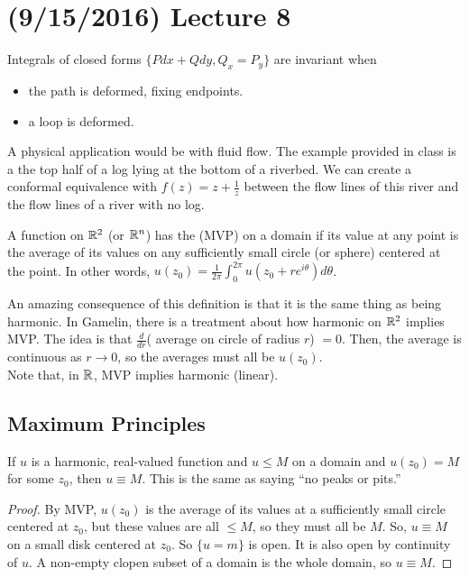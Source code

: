 \documentclass[11pt,leqno,oneside]{amsart}
\numberwithin{thm}{section}
\begin{document}
  \section{(9/15/2016) Lecture 8}
  Integrals of closed forms $\{Pdx+Qdy, Q_x = P_y\}$ are invariant
  when
  \begin{itemize}
  \item the path is deformed, fixing endpoints.
  \item a loop is deformed.
  \end{itemize}

  A physical application would be with fluid flow. The example
  provided in class is a the top half of a log lying at the bottom of
  a riverbed. We can create a conformal equivalence with $f(z) =
  z+\frac{1}{z}$ between the flow lines of this river and the flow
  lines of a river with no log.

  \begin{defn}
    A function on ${\mathbb R}^2$ (or ${\mathbb R}^n$) has the  (MVP) on a domain if its value at any point is the
    average of its values on any sufficiently small circle (or sphere)
    centered at the point. In other words, $u(z_0) = \frac{1}{2\pi}
    \int_0^{2\pi} u(z_0+re^{i\theta}) d\theta$.
  \end{defn}
  An amazing consequence of this definition is that it is the same
  thing as being harmonic. In Gamelin, there is a treatment about how
  harmonic on ${\mathbb R}^2$ implies MVP. The idea is that $\frac{d}{dr}$(
  average on circle of radius $r$) $=0$. Then, the average is
  continuous as $r \to 0$, so the averages must all be $u(z_0)$. \\

  Note that, in ${\mathbb R}$, MVP implies harmonic (linear).

  \subsection*{Maximum Principles}

  \begin{thm}
    If $u$ is a harmonic, real-valued function and $u \leq M$ on a
    domain and $u(z_0) = M$ for some $z_0$, then $u \equiv M$. This is
    the same as saying ``no peaks or pits.''
  \end{thm}
  \begin{proof}
    By MVP, $u(z_0)$ is the average of its values at a sufficiently
    small circle centered at $z_0$, but these values are all $\leq M$,
    so they must all be $M$. So, $u \equiv M$ on a small disk centered
    at $z_0$. So $\{u = m\}$ is open. It is also open by continuity of
    $u$. A non-empty clopen subset of a domain is the whole domain, so
    $u \equiv M$.
  \end{proof}
\end{document}
